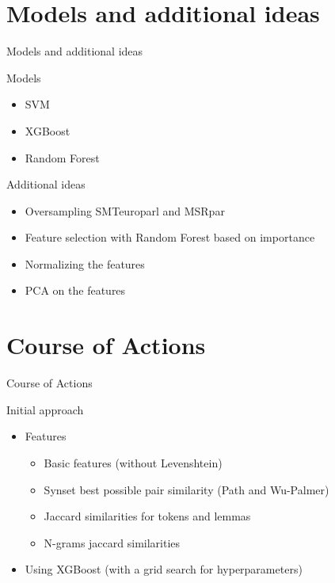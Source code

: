\documentclass[usenames,dvipsnames]{beamer}
\begin{document}
\section{Models and additional ideas}
\begin{frame}{Models and additional ideas}
    \begin{block}{Models}
        \begin{itemize}
            \item SVM
            \item XGBoost
            \item Random Forest
        \end{itemize}
    \end{block}

    \begin{block}{Additional ideas}
        \begin{itemize}
            \item Oversampling SMTeuroparl and MSRpar
            \item Feature selection with Random Forest based on importance
            \item Normalizing the features
            \item PCA on the features
        \end{itemize}
    \end{block}
\end{frame}

\section{Course of Actions}

\begin{frame}{Course of Actions}
    \begin{block}{Initial approach}
        \begin{itemize}
            \item Features
                \begin{itemize}
                    \item Basic features (without Levenshtein)
                    \item Synset best possible pair similarity (Path and Wu-Palmer)
                    \item Jaccard similarities for tokens and lemmas
                    \item N-grams jaccard similarities
                \end{itemize}
            \item Using XGBoost (with a grid search for hyperparameters)
        \end{itemize}
    \end{block}
\end{frame}
\end{document}
